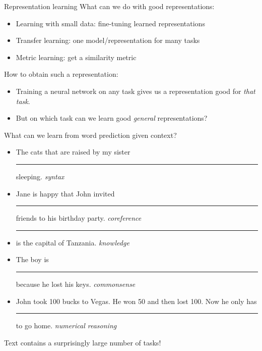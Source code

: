 \documentclass[usenames,dvipsnames,notes,11pt,aspectratio=169,hyperref={colorlinks=true, linkcolor=blue}]{beamer}
\begin{document}
\begin{frame}
    {Representation learning}
    What can we do with good representations:\\
    \begin{itemize}
        \item Learning with small data: fine-tuning learned representations
        \item Transfer learning: one model/representation for many tasks 
        \item Metric learning: get a similarity metric
    \end{itemize}

    \pause\bigskip
    How to obtain such a representation:\\
    \begin{itemize}
        \item Training a neural network on any task gives us a representation good for \textit{that task}.
        \item But on which task can we learn good \textit{general} representations?
    \end{itemize}
\end{frame}

\begin{frame}
    {What can we learn from word prediction given context?}
    \begin{itemize}
        \itemsep1em
        \item The cats that are raised by my sister \rule{1.5cm}{0.5mm} sleeping. \pause\hfill \textit{syntax}
        \item Jane is happy that John invited \rule{1.5cm}{0.5mm} friends to his birthday party. \pause\hfill \textit{coreference}
        \item \rule{1.5cm}{0.5mm} is the capital of Tanzania. \pause\hfill \textit{knowledge}
        \item The boy is \rule{1.5cm}{0.5mm} because he lost his keys.  \pause\hfill \textit{commonsense}
        \item John took 100 bucks to Vegas. He won 50 and then lost 100. Now he only has \rule{1.5cm}{0.5mm} to go home. \pause\hfill \textit{numerical reasoning}
    \end{itemize}

    \pause\medskip
    Text contains a surprisingly large number of tasks!

\end{frame}
\end{document}
